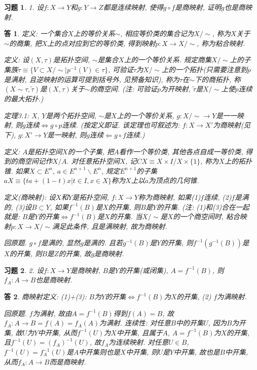 \documentclass{ctexart}%
\newtheorem*{exercise}{习题}
\newtheorem*{solution}{答}
\theoremstyle{definition}
\theoremstyle{remark}
\begin{document}
\begin{exercise}1. 设$f: X\rightarrow Y$和$g: Y\rightarrow Z$都是连续映射, 使得$g\circ f$是商映射, 证明$g$也是商映射.
\end{exercise}
\begin{solution}
定义: 一个集合$X$上的等价关系$\sim$, 相应等价类的集合记为$X\slash \sim$, 称为$X$关于$\sim$的商集, 把$X$上的点对应到它的等价类, 得到映射$p: X\rightarrow X\slash \sim$, 称为粘合映射. 

定义: 设$(X,\tau)$是拓扑空间, $\sim$是集合$X$上的一个等价关系. 规定商集$X\slash\sim$上的子集族$\widetilde{\tau}\equiv \{V\subset X\slash \sim |p^{-1}(V)\in \tau\}$, 可验证$\widetilde{\tau}$为$X\slash\sim$上的一个拓扑(只需要注意到$p$是满射, 且逆映射的运算可提到括号外, 见预备知识), 称为$\tau$在$\sim$下的商拓扑, 称$(X\sim\tau, \widetilde{\tau})$是$(X,\tau)$关于$\sim$的商空间. (注: 可验证$p$为开映射, $\widetilde{\tau}$是$X\slash \sim$上使$p$连续的最大拓扑.)

定理3.1: $X$, $Y$是两个拓扑空间, $\sim$是$X$上的一个等价关系, $g:X\slash \sim \rightarrow Y$是一一映射, 则$g$连续$\Longleftrightarrow g\circ p$连续. (按定义即证. 该定理也可叙述为: $f:X\rightarrow X'$为商映射(见下), $g:X'\rightarrow Y$是一映射, 则$g$连续$\Longleftarrow g\circ f$连续.)

定义: $A$是拓扑空间$X$的一个子集, 把$A$看作一个等价类, 其他各点自成一等价类, 得到的商空间记作$X\slash A$. 对任意拓扑空间$X$, 记$CX\equiv X\times I\slash X\times \{1\}$, 称为$X$上的拓扑锥. 如果$X\subset E^n$, $a\in E^{n+1}\backslash E^n$, 规定$E^{n+1}$的子集$aX\equiv \{ta+(1-t)x|t\in I, x\in X\}$称为$X$上以$a$为顶点的几何锥. 

定义(商映射): 设$X$和$Y$是拓扑空间, $f:X\rightarrow Y$称为商映射, 如果(1)$f$连续, (2)$f$是满的, (3)设$B\subset Y$, 如果$f^{-1}(B)$是$X$的开集, 则$B$是$Y$的开集. (注: (1)和(3)合在一起就是: $B$是$Y$的开集$\Longleftrightarrow f^{-1}(B)$是$X$的开集. 当$X\slash \sim$是$X$的一个商空间时, 粘合映射$p:X\rightarrow X\slash \sim$满足此条件, 且是满映射, 故为商映射.

回原题. $g\circ f$是满的, 显然$g$是满的. 且若$g^{-1}(B)$是$Y$的开集, 则$f^{-1}(g^{-1}(B))$是$X$的开集,
则$B$是$Z$的开集, 故$g$是商映射.
\end{solution}

\begin{exercise}2. 设$f:X\rightarrow Y$是商映射, $B$是$Y$的开集(或闭集), $A=f^{-1}(B)$, 则$f_A: A\rightarrow B$也是商映射.
\end{exercise}
\begin{solution}商映射定义: (1)+(3): $B$为$Y$的开集$\Longleftrightarrow f^{-1}(B)$为$X$的开集, (2) $f$为满映射.

回原题. $f$为满射, 故由$A=f^{-1}(B)$得到$f(A)=B$, 故$f_A:A\rightarrow B=f(A)=f_A(A)$为满射. 连续性: 对任意$B$中的开集$U$, 因为$B$为开集, 故$U$为$Y$中开集, 从而$f^{-1}(U)$为$X$中开集, 且属于$A$, $A=f^{-1}(B)$为$X$的开集, 且$f^{-1}(U)=(f_A)^{-1}(U)$, 故$f_A$为连续映射. 对任意$U\in B$, $f^{-1}(U)=f_A^{-1}(U)$是$A$中开集则也是$X$中开集, 则$U$是$Y$中开集, 故也是$B$中开集, 从而$f_A:A\rightarrow B$而是商映射. 
\end{solution}
\end{document}
